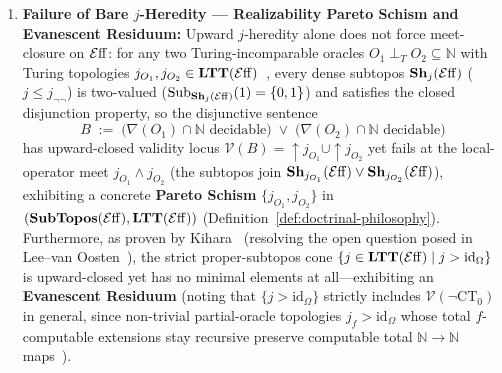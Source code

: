\begin{theorem}
\begin{enumerate}
  \item \textbf{Failure of Bare $j$-Heredity --- Realizability Pareto Schism and Evanescent Residuum:} Upward $j$-heredity alone does not force meet-closure on $\mathcal{E}\mathrm{ff}$: for any two Turing-incomparable oracles $O_1 \perp_T O_2 \subseteq \mathbb{N}$ with Turing topologies $j_{O_1}, j_{O_2} \in \mathbf{LTT}(\mathcal{E}\mathrm{ff})$~\cite{LeeVanOosten13}, every dense subtopos $\mathbf{Sh}_j(\mathcal{E}\mathrm{ff})$ ($j \le j_{\neg\neg}$) is two-valued ($\mathrm{Sub}_{\mathbf{Sh}_j(\mathcal{E}\mathrm{ff})}(1) = \{0, 1\}$) and satisfies the closed disjunction property, so the disjunctive sentence
  \[
    B \;:=\; \bigl(\nabla(O_1) \cap \mathbb{N}\text{ decidable}\bigr) \;\lor\; \bigl(\nabla(O_2) \cap \mathbb{N}\text{ decidable}\bigr)
  \]
  has upward-closed validity locus $\mathcal{V}(B) = {\uparrow} j_{O_1} \cup {\uparrow} j_{O_2}$ yet fails at the local-operator meet $j_{O_1} \wedge j_{O_2}$ (the subtopos join $\mathbf{Sh}_{j_{O_1}}(\mathcal{E}\mathrm{ff}) \vee \mathbf{Sh}_{j_{O_2}}(\mathcal{E}\mathrm{ff})$), exhibiting a concrete \textbf{Pareto Schism} $\{j_{O_1}, j_{O_2}\}$ in $(\mathbf{SubTopos}(\mathcal{E}\mathrm{ff}), \mathbf{LTT}(\mathcal{E}\mathrm{ff}))$ (Definition~\ref{def:doctrinal-philosophy}). Furthermore, as proven by Kihara~\cite[\S 4]{Kihara23} (resolving the open question posed in Lee--van Oosten~\cite{LeeVanOosten13}), the strict proper-subtopos cone $\{j \in \mathbf{LTT}(\mathcal{E}\mathrm{ff}) \mid j > \mathrm{id}_\Omega\}$ is upward-closed yet has no minimal elements at all---exhibiting an \textbf{Evanescent Residuum} (noting that $\{j > \mathrm{id}_\Omega\}$ strictly includes $\mathcal{V}(\neg\mathrm{CT}_0)$ in general, since non-trivial partial-oracle topologies $j_f > \mathrm{id}_\Omega$ whose total $f$-computable extensions stay recursive preserve computable total $\mathbb{N} \to \mathbb{N}$ maps~\cite{LeeVanOosten13}).

\end{enumerate}

\end{theorem}

